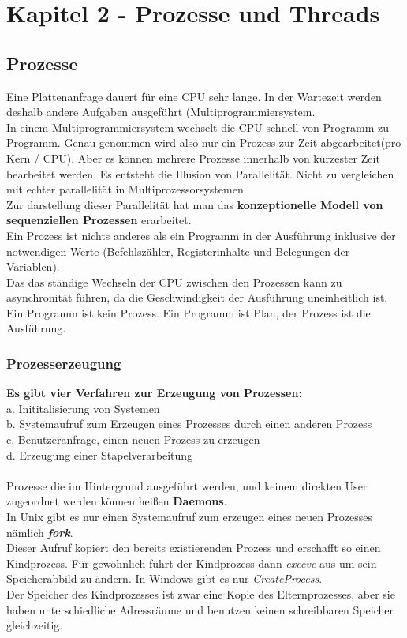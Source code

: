 \documentclass[12pt,a4paper]{univention}
\begin{document}
\section{Kapitel 2 - Prozesse und Threads}
\subsection{Prozesse}
Eine Plattenanfrage dauert für eine CPU sehr lange.
In der Wartezeit werden deshalb andere Aufgaben ausgeführt (Multiprogrammiersystem.\\
In einem Multiprogrammiersystem wechselt die CPU schnell von Programm zu Programm. Genau genommen wird also nur ein Prozess zur Zeit abgearbeitet(pro Kern / CPU). Aber es können mehrere Prozesse innerhalb von kürzester Zeit bearbeitet werden. Es entsteht die Illusion von Parallelität. Nicht zu vergleichen mit echter parallelität in Multiprozessorsystemen.\\
Zur darstellung dieser Parallelität hat man das \textbf{konzeptionelle Modell von sequenziellen Prozessen} erarbeitet. \\
Ein Prozess ist nichts anderes als ein Programm in der Ausführung inklusive der notwendigen Werte (Befehlszähler, Registerinhalte und Belegungen der Variablen).\\
Das das ständige Wechseln der CPU zwischen den Prozessen kann zu asynchronität führen, da die Geschwindigkeit der Ausführung uneinheitlich ist.\\
Ein Programm ist kein Prozess. Ein Programm ist Plan, der Prozess ist die Ausführung.
\subsubsection{Prozesserzeugung}
\textbf{Es gibt vier Verfahren zur Erzeugung von Prozessen:}\\
a. Inititalisierung von Systemen\\
b. Systemaufruf zum Erzeugen eines Prozesses durch einen anderen Prozess\\
c. Benutzeranfrage, einen neuen Prozess zu erzeugen\\
d. Erzeugung einer Stapelverarbeitung\\\\
Prozesse die im Hintergrund ausgeführt werden, und keinem direkten User zugeordnet werden können heißen \textbf{Daemons}.\\
In Unix gibt es nur einen Systemaufruf zum erzeugen eines neuen Prozesses nämlich \textbf{\textit{fork}}.\\
Dieser Aufruf kopiert den bereits existierenden Prozess und erschafft so einen Kindprozess. Für gewöhnlich führt der Kindprozess dann \textit{execve} aus um sein Speicherabbild zu ändern. In Windows gibt es nur \textit{CreateProcess}.\\
Der Speicher des Kindprozesses ist zwar eine Kopie des Elternprozesses, aber sie haben unterschiedliche Adressräume und benutzen keinen schreibbaren Speicher gleichzeitig.
\end{document}
